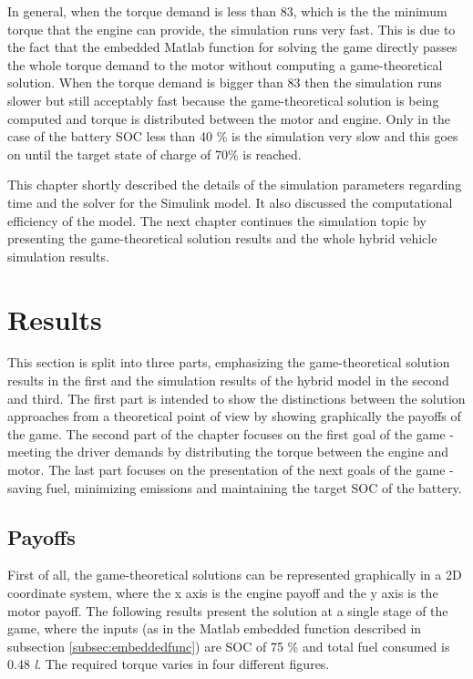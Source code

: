 In general, when the torque demand is less than 83, which is the the minimum torque that the engine can provide, the simulation runs very fast. This is due to the fact that the embedded Matlab function for solving the game directly passes the whole torque demand to the motor without computing a game-theoretical solution. When the torque demand is bigger than 83 then the simulation runs slower but still acceptably fast because the game-theoretical solution is being computed and torque is distributed between the motor and engine. Only in the case of the battery SOC less than 40 \% is the simulation very slow and this goes on until the target state of charge of 70\% is reached.

This chapter shortly described the details of the simulation parameters regarding time and the solver for the Simulink model. It also discussed the computational efficiency of the model. The next chapter continues the simulation topic by presenting the game-theoretical solution results and the whole hybrid vehicle simulation results.


\section{Results}
This section is split into three parts, emphasizing the game-theoretical solution results in the first and the simulation results of the hybrid model in the second and third. The first part is intended to show the distinctions between the solution approaches from a theoretical point of view by showing graphically the payoffs of the game. The second part of the chapter focuses on the first goal of the game - meeting the driver demands by distributing the torque between the engine and motor. The last part focuses on the presentation of the next goals of the game - saving fuel, minimizing emissions and maintaining the target SOC of the battery.

\subsection{Payoffs}
First of all, the game-theoretical solutions can be represented graphically in a 2D coordinate system, where the x axis is the engine payoff and the y axis is the motor payoff. The following results present the solution at a single stage of the game, where the inputs (as in the Matlab embedded function described in subsection \ref{subsec:embeddedfunc}) are SOC of 75 \% and total fuel consumed is 0.48 \textit{l}. The required torque varies in four different figures. 


